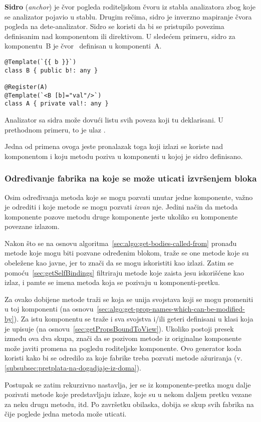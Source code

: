 \textbf{Sidro} (\textsl{anchor}) je čvor pogleda roditeljskom čvoru iz stabla analizatora zbog koje se analizator pojavio u stablu.
Drugim rečima, sidro je inverzno mapiranje čvora pogleda na dete-analizator.
Sidro se koristi da bi se pristupilo povezima definisanim nad komponentom ili direktivom.
U sledećem primeru, sidro za komponentu~\code B je čvor~ definisan u komponenti~\code A.

\begin{lstlisting}
@Template(`{{ b }}`)
class B { public b!: any }

@Register(A)
@Template(`<B [b]="val"/>`)
class A { private val!: any }
\end{lstlisting}

Analizator sa sidra može dovući listu svih poveza koji tu deklarisani.
U prethodnom primeru, to je ulaz .

Jedna od primena ovoga jeste pronalazak toga koji izlazi se koriste nad komponentom i koju metodu poziva u komponenti u kojoj je sidro definisano.

\subsubsection{Određivanje fabrika na koje se može uticati izvršenjem bloka} %
\label{fn:getFactoriesAffectedByCalling}

Osim određivanja metoda koje se mogu pozvati unutar jedne komponente, važno je odrediti i koje metode se mogu pozvati \emph{izvan} nje.
Jedini način da metoda komponente pozove metodu druge komponente jeste ukoliko su komponente povezane izlazom.

Nakon što se na osnovu algoritma~\cref{sec:algo:get-bodies-called-from} pronađu metode koje mogu biti pozvane određenim blokom, traže se one metode koje su obeležene kao javne, jer to znači da se mogu iskoristiti kao izlazi.
Zatim se pomoću~\cref{sec:getSelfBindings} filtriraju metode koje zaista jesu iskorišćene kao izlaz, i pamte se imena metoda koja se pozivaju u komponenti-pretku.

Za ovako dobijene metode traži se koja se unija svojstava koji se mogu promeniti u toj komponenti (na osnovu~\cref{sec:algo:get-prop-names-which-can-be-modified-by}).
Za istu komponentu se traže i sva svojstva i/ili geteri definisani u klasi koja je upisuje (na osnovu~\cref{sec:getPropsBoundToView}).
Ukoliko postoji presek između ova dva skupa, znači da se pozivom metode iz originalne komponente može javiti promena na pogledu roditeljske komponente.
Ovo generator koda koristi kako bi se odredilo za koje fabrike treba pozvati metode ažuriranja (v. \cref{subsubsec:pretplata-na-dogadjaje-iz-doma}).

Postupak se zatim rekurzivno nastavlja, jer se iz komponente-pretka mogu dalje pozivati metode koje predstavljaju izlaze, koje su u nekom daljem pretku vezane za neku drugu metodu, itd.
Po završetku obilaska, dobija se skup svih fabrika na čije poglede jedna metoda može uticati.
